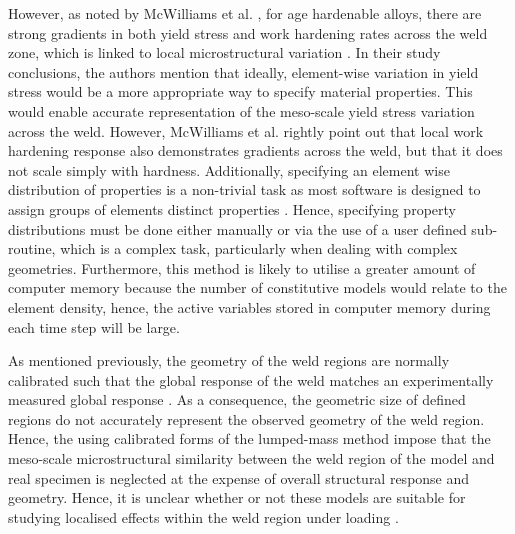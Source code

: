 However, as noted by McWilliams et al. \cite{McWilliams2013}, for age hardenable alloys, there are strong gradients in both yield stress and work hardening rates across the weld zone, which is linked to local microstructural variation \cite{Sato2001}. In their study conclusions, the authors mention that ideally, element-wise variation in yield stress would be a more appropriate way to specify material properties. 
This would enable accurate representation of the meso-scale yield stress variation across the weld. However, McWilliams et al. rightly point out that local work hardening response also demonstrates gradients across the weld, but that it does not scale simply with hardness. 
Additionally, specifying an element wise distribution of properties is a non-trivial task as most software is designed to assign groups of elements distinct properties \cite{Hallquist2006}. Hence, specifying property distributions must be done either manually or via the use of a user defined sub-routine, which is a complex task, particularly when dealing with complex geometries. Furthermore, this method is likely to utilise a greater amount of computer memory because the number of constitutive models would relate to the element density, hence, the active variables stored in computer memory during each time step will be large. 
%

As mentioned previously, the geometry of the weld regions are normally calibrated such that the global response of the weld matches an experimentally measured global response \cite{McWilliams2013,Grujicic2011a}. As a consequence, the geometric size of defined regions do not accurately represent the observed geometry of the weld region. Hence, the using calibrated forms of the lumped-mass method impose that the meso-scale microstructural similarity between the weld region of the model and real specimen is neglected at the expense of overall structural response and geometry. Hence, it is unclear whether or not these models are suitable for studying localised effects within the weld region under loading \cite{McWilliams2013,Grujicic2011a}.

